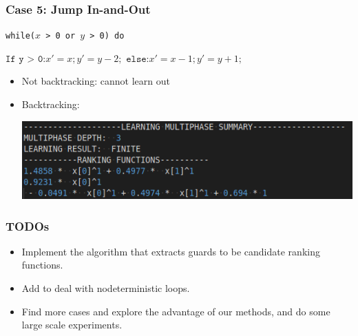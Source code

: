 \documentclass[10pt]{beamer}
\begin{document}
\begin{frame}\frametitle{Case 5: Jump In-and-Out}
\begin{example}
\texttt{while($x$ > 0 or $y$ > 0) do }

$\texttt{If y > 0:} x' = x; y' = y - 2;$
$\texttt{else:} x' = x - 1; y' = y + 1;$

\end{example}
\begin{itemize}
\item Not backtracking: cannot learn out

\item Backtracking:
\begin{center}
\includegraphics[scale=0.5]{6.png}
\end{center}
\end{itemize}
\end{frame}


\begin{frame}\frametitle{TODOs}
\begin{itemize}

\item Implement the algorithm that extracts guards to be candidate ranking functions.

\item Add to deal with nodeterministic loops.

\item Find more cases and explore the advantage of our methods, and do some large scale experiments.
\end{itemize}
\end{frame}
\end{document}
